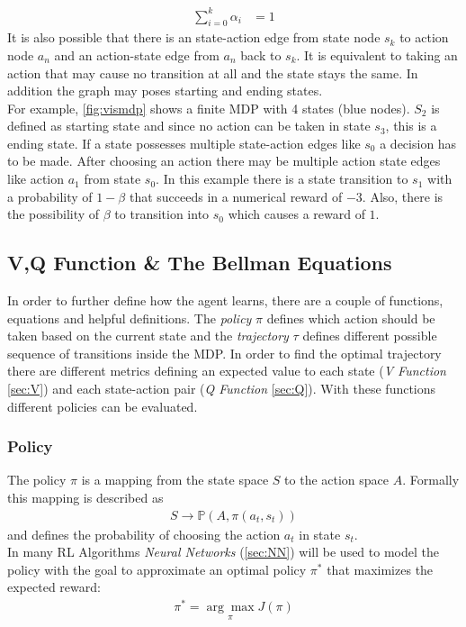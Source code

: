 \begin{align}
	\sum_{i=0}^{k} \alpha_i &= 1
\end{align}
\newline
It is also possible that there is an state-action edge from state node $s_k$ to action node $a_n$ and an action-state edge from $a_n$ back to $s_k$. It is equivalent to taking an action that may cause no transition at all and the state stays the same. In addition the graph may poses starting and ending states.\\
For example, \cref{fig:vismdp} shows a finite MDP with 4 states (blue nodes). $S_2$ is defined as starting state and since no action can be taken in state $s_3$, this is a ending state.  If a state possesses multiple state-action edges like $s_0$ a decision has to be made. After choosing an action there may be multiple action state edges like action $a_1$ from state $s_0$. In this example there is a state transition to $s_1$ with a probability of $1-\beta$ that succeeds in a numerical reward of $-3$. Also, there is the possibility of $\beta$ to transition into $s_0$ which causes a reward of $1$.

\newpage

\subsection{V,Q Function \& The Bellman Equations}
In order to further define how the agent learns, there are a couple of functions, equations and helpful definitions. The \emph{policy} $\pi$ defines which action should be taken based on the current state and the \emph{trajectory} $\tau$ defines different possible sequence of transitions inside the MDP. In order to find the optimal trajectory there are different metrics defining an expected value to each state (\emph{V Function} \cref{sec:V}) and each state-action pair (\emph{Q Function} \cref{sec:Q}). With these functions different policies can be evaluated. 

\subsubsection{Policy}
The policy $\pi$ is a mapping from the state space $S$ to the action space $A$. Formally this mapping is described as
\begin{align*}
	S \to \mathbb{P}(A, \pi (a_t,s_t))
\end{align*}
\newline
and defines the probability of choosing the action $a_t$ in state $s_t$.\\
In many RL Algorithms \emph{Neural Networks} (\cref{sec:NN}) will be used to model the policy with the goal to approximate an optimal policy $\pi^*$ that maximizes the expected reward:
\begin{align*}
	\pi^* = \underset{\pi} {\arg \max} J(\pi)
\end{align*}

